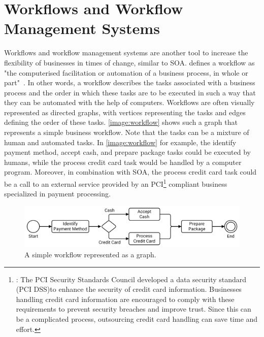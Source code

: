 \section{Workflows and Workflow Management Systems}

Workflows and workflow management systems are another tool to increase the flexibility of businesses in times of change, similar to SOA.
\citeauthor*{workflow:referencemodel} defines a workflow as "the computerised facilitation or automation of a business process, in whole or part"~\autocite{workflow:referencemodel}.
In other words, a workflow describes the tasks associated with a business process and the order in which these tasks are to be executed in such a way that they can be automated with the help of computers.
Workflows are often visually represented as directed graphs, with vertices representing the tasks and edges defining the order of these tasks.
\autoref{image:workflow} shows such a graph that represents a simple business workflow.
Note that the tasks can be a mixture of human and automated tasks.
In \autoref{image:workflow} for example, the identify payment method, accept cash, and prepare package tasks could be executed by humans, while the process credit card task would be handled by a computer program.
Moreover, in combination with SOA, the process credit card task could be a call to an external service provided by an PCI\footnote{: The PCI Security Standards Council developed a data security standard (PCI DSS)\footnotemark to enhance the security of credit card information. Businesses handling credit card information are encouraged to comply with these requirements to prevent security breaches and improve trust. Since this can be a complicated process, outsourcing credit card handling can save time and effort.} compliant business specialized in payment processing.


\begin{figure}[!htbp]
	\centering
	\includegraphics[resolution=600]{fundamentals/assets/workflow}
	\caption{A simple workflow represented as a graph.}
	\label{image:workflow}
\end{figure}


